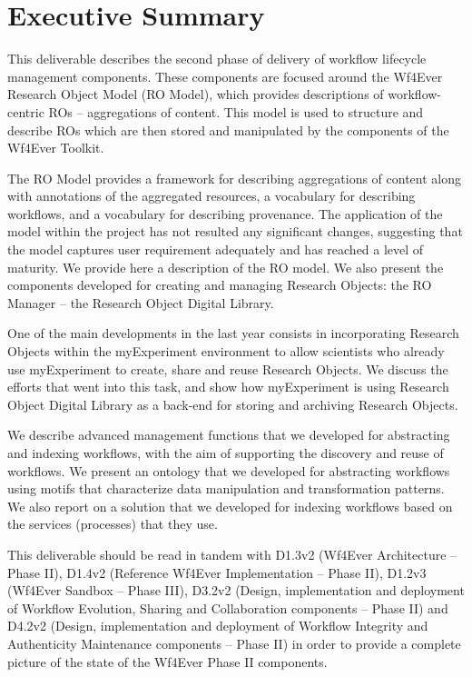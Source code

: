 \documentclass[a4paper, twoside, 11pt]{article}
\begin{document}
\section*{Executive Summary}
This deliverable describes the second phase of delivery of workflow
lifecycle management components. These components are focused around
the Wf4Ever Research Object Model (RO Model), which provides
descriptions of workflow-centric ROs -- aggregations of content. This
model is used to structure and describe ROs which are then stored and
manipulated by the components of the Wf4Ever Toolkit.

The RO Model provides a framework for describing aggregations of
content along with annotations of the aggregated resources, a
vocabulary for describing workflows, and a vocabulary for describing
provenance. The application of the model within the project has not resulted any significant changes, suggesting that the model captures user requirement adequately and has reached a level of maturity.
We provide here a description of the RO model.
We also present the components developed for creating and managing Research Objects: the
RO Manager -- the
Research Object Digital Library. 


One of the main developments in the last year consists in incorporating Research Objects within the myExperiment environment to allow scientists who already use myExperiment to create, share and reuse Research Objects. We discuss the efforts that went into this task, and show how myExperiment is using Research Object Digital Library as a back-end for storing and archiving Research Objects.

We  describe advanced management functions that we developed for abstracting and indexing workflows, with the aim of supporting the discovery and reuse of workflows. We present an ontology that we developed for abstracting workflows using motifs that characterize data manipulation and transformation patterns. We also report on a solution that we developed for indexing workflows based on the services (processes) that they use.

This deliverable should be read in tandem with D1.3v2 (Wf4Ever
Architecture -- Phase II), D1.4v2 (Reference Wf4Ever Implementation --
Phase II), D1.2v3 (Wf4Ever Sandbox -- Phase III), D3.2v2 (Design,
implementation and deployment of Workflow Evolution, Sharing and
Collaboration components -- Phase II) and D4.2v2 (Design,
implementation and deployment of Workflow Integrity and Authenticity
Maintenance components -- Phase II) in order to provide a complete
picture of the state of the Wf4Ever Phase II components.
\end{document}
